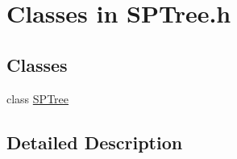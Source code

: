 \hypertarget{group___s_p_t_r_e_e___c_l_a_s_s_e_s}{}\section{Classes in S\+P\+Tree.\+h}
\label{group___s_p_t_r_e_e___c_l_a_s_s_e_s}
\subsection*{Classes}
\begin{DoxyCompactItemize}
\item 
class \mbox{\hyperlink{class_s_p_tree}{S\+P\+Tree}}
\end{DoxyCompactItemize}


\subsection{Detailed Description}
